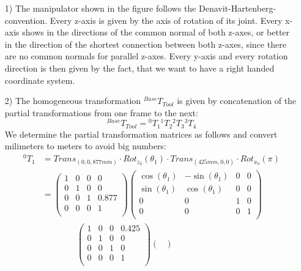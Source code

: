 \documentclass[a4paper,11pt]{article}
\begin{document}
\begin {enumerate}
    \begin{enumerate}
        \item[1)] The manipulator shown in the figure follows the Denavit-Hartenberg-convention. Every z-axis is given by the axis of rotation of its joint. Every x-axis shows in the directions of the common normal of both z-axes, or better in the direction of the shortest connection between both z-axes, since there are no common normals for parallel z-axes. Every y-axis and every rotation direction is then given by the fact, that we want to have a right handed coordinate system.
        \item[2)] The homogeneous transformation $^{Base}T_{Tool}$ is given by concatenation of the partial transformations from one frame to the next:
        $${^{Base}T_{Tool}} = {^0T_1}{^1T_2}{^2T_3}{^3T_4}$$
        We determine the partial transformation matrices as follows and convert milimeters to meters to avoid big numbers:
        \begin{align*}
            {^0T_1} &= Trans_{(0,0,877mm)} \cdot Rot_{z_0}(\theta_1) \cdot Trans_{(425mm,0,0)} \cdot Rot_{x_0}(\pi)\\
            &= \begin{pmatrix}
                1 & 0 & 0 & 0\\
                0 & 1 & 0 & 0\\
                0 & 0 & 1 & 0.877\\
                0 & 0 & 0 & 1\\
            \end{pmatrix}
            \begin{pmatrix}
                \cos(\theta_1) & -\sin(\theta_1) & 0 & 0\\
                \sin(\theta_1) & \cos(\theta_1) & 0 & 0\\
                0 & 0 & 1 & 0\\
                0 & 0 & 0 & 1\\
            \end{pmatrix}\\
            &\qquad\qquad \begin{pmatrix}
                1 & 0 & 0 & 0.425\\
                0 & 1 & 0 & 0\\
                0 & 0 & 1 & 0\\
                0 & 0 & 0 & 1\\
            \end{pmatrix}
            \begin{pmatrix}

\end{pmatrix}
\end{align*}
\end{enumerate}
\end{enumerate}
\end{document}
